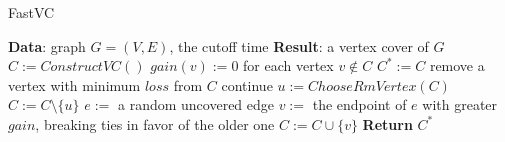 \documentclass[12pt]{article}
\begin{document}
%
% 
\vspace{-4ex}
\begin{algorithm}
  \caption{FastVC}
  \begin{algorithmic}[1] 
  \State \textbf{Data}: graph $G = (V,E)$, the cutoff time
  \State \textbf{Result}: a vertex cover of $G$
  \State $C := ConstructVC()$
  \State $gain(v) := 0$ for each vertex $v \notin C $
        \State $C^{*} := C$
        \State remove a vertex with minimum $loss$ from $C$
        \State continue
        \EndIf
        \State $u := ChooseRmVertex(C)$
        \State $C := C \setminus \{u\} $
        \State $e := $ a random uncovered edge
        \State $v := $ the endpoint of $e$ with greater $gain$, breaking ties in favor of the older one
        \State $C := C\cup \{v\}$
      \EndWhile
      \State \textbf{Return} $C^*$
  \end{algorithmic}
\end{algorithm}
\end{document}
